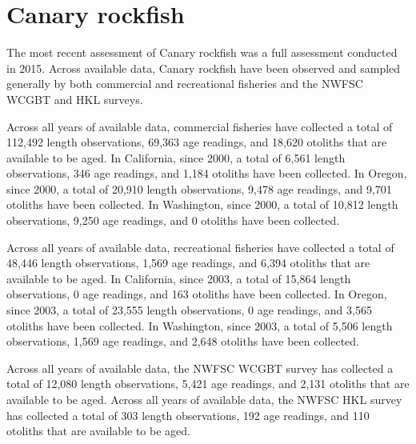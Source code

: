 \documentclass[11pt,
  english,
  letterpaper,
]{article}
\begin{document}
\hypertarget{canary-rockfish}{%
\section{Canary rockfish}\label{canary-rockfish}}

\leavevmode\tagmcend\tagstructend


The most recent assessment of Canary rockfish was a full assessment conducted in 2015. Across available data, Canary rockfish have been observed and sampled generally by both commercial and recreational fisheries and the NWFSC WCGBT and HKL surveys.

\leavevmode\tagmcend\tagstructend\par


Across all years of available data, commercial fisheries have collected a total of 112,492 length observations, 69,363 age readings, and 18,620 otoliths that are available to be aged. In California, since 2000, a total of 6,561 length observations, 346 age readings, and 1,184 otoliths have been collected. In Oregon, since 2000, a total of 20,910 length observations, 9,478 age readings, and 9,701 otoliths have been collected. In Washington, since 2000, a total of 10,812 length observations, 9,250 age readings, and 0 otoliths have been collected.

\leavevmode\tagmcend\tagstructend\par


Across all years of available data, recreational fisheries have collected a total of 48,446 length observations, 1,569 age readings, and 6,394 otoliths that are available to be aged. In California, since 2003, a total of 15,864 length observations, 0 age readings, and 163 otoliths have been collected. In Oregon, since 2003, a total of 23,555 length observations, 0 age readings, and 3,565 otoliths have been collected. In Washington, since 2003, a total of 5,506 length observations, 1,569 age readings, and 2,648 otoliths have been collected.

\leavevmode\tagmcend\tagstructend\par


Across all years of available data, the NWFSC WCGBT survey has collected a total of 12,080 length observations, 5,421 age readings, and 2,131 otoliths that are available to be aged. Across all years of available data, the NWFSC HKL survey has collected a total of 303 length observations, 192 age readings, and 110 otoliths that are available to be aged.
\end{document}
